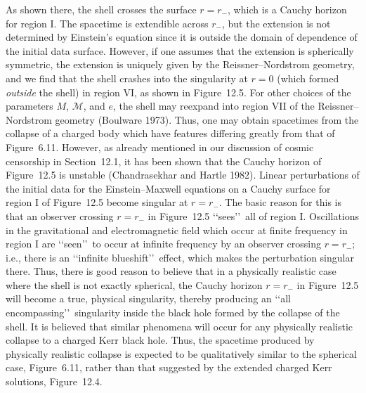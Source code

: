 

As shown there, the shell crosses the surface \(r=r_-\), which is a Cauchy horizon
for region I. The spacetime is extendible across \(r_-\), but the extension is not
determined by Einstein's equation since it is outside the domain of dependence of the
initial data surface. However, if one assumes that the extension is spherically
symmetric, the extension is uniquely given by the Reissner--Nordstrom geometry, and
we find that the shell crashes into the singularity at \(r=0\) (which formed
\emph{outside} the shell) in region VI, as shown in Figure~12.5. For other choices of
the parameters \(M\), \(\mathcal M\), and \(e\), the shell may reexpand into region VII
of the Reissner--Nordstrom geometry (Boulware 1973). Thus, one may obtain
spacetimes from the collapse of a charged body which have features differing greatly
from that of Figure~6.11. However, as already mentioned in our discussion of cosmic
censorship in Section~12.1, it has been shown that the Cauchy horizon of
Figure~12.5 is unstable (Chandrasekhar and Hartle 1982). Linear perturbations of the
initial data for the Einstein--Maxwell equations on a Cauchy surface for region I of
Figure~12.5 become singular at \(r=r_-\). The basic reason for this is that an observer
crossing \(r=r_-\) in Figure~12.5 \lq\lq sees\rq\rq\ all of region I. Oscillations in
the gravitational and electromagnetic field which occur at finite frequency in region I
are \lq\lq seen\rq\rq\ to occur at infinite frequency by an observer crossing \(r=r_-\);
i.e., there is an \lq\lq infinite blueshift\rq\rq\ effect, which makes the perturbation
singular there. Thus, there is good reason to believe that in a physically realistic case
where the shell is not exactly spherical, the Cauchy horizon \(r=r_-\) in
Figure~12.5 will become a true, physical singularity, thereby producing an
\lq\lq all encompassing\rq\rq\ singularity inside the black hole formed by the collapse
of the shell. It is believed that similar phenomena will occur for any physically
realistic collapse to a charged Kerr black hole. Thus, the spacetime produced by
physically realistic collapse is expected to be qualitatively similar to the spherical
case, Figure~6.11, rather than that suggested by the extended charged Kerr solutions,
Figure~12.4.

